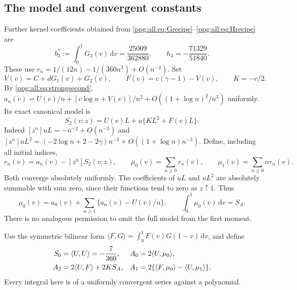 \documentclass[11pt,letterpaper]{article}
\theoremstyle{remark}\newtheorem{remark}[theorem]{Remark}
\numberwithin{equation}{section}
\newcommand{\dd}{\mathrm d}
\newcommand{\ip}[2]{\langle #1,#2\rangle}
\begin{document}
\subsection{The model and convergent constants}
Further kernel coefficients obtained from \eqref{ppg:all:eq:Grecipe}--\eqref{ppg:all:eq:Hrecipe} are
\begin{equation}\label{ppg:all:eq:thirdkernel}
 b_3^*:=\int_0^1G_3(v)\,\dd v=\frac{25009}{362880},
 \qquad h_3=-\frac{71329}{51840}.
\end{equation}
These use $r_n=1/(12n)-1/(360n^3)+O(n^{-4})$. Set
\begin{equation}\label{ppg:all:eq:VF}
 V(v)=C+dG_1(v)+G_2(v),\qquad
 F(v)=c(\gamma-1)-V(v),\qquad K=-c/2.
\end{equation}
By \eqref{ppg:all:eq:strongsecond},
$a_n(v)=U(v)/n+[c\log n+V(v)]/n^2+O((1+\log n)^2/n^3)$ uniformly. Its exact canonical model is
\begin{equation}\label{ppg:all:eq:S2}
 S_2(v;z)=U(v)L+u\{KL^2+F(v)L\}.
\end{equation}
Indeed $[z^n]uL=-n^{-2}+O(n^{-3})$ and
$[z^n]uL^2=(-2\log n+2-2\gamma)n^{-2}+O((1+\log n)n^{-3})$.
Define, including all initial indices,
\begin{equation}\label{ppg:all:eq:muThird}
 r_n(v)=a_n(v)-[z^n]S_2(v;z),\qquad
 \mu_0(v)=\sum_{n\ge0}r_n(v),\qquad
 \mu_1(v)=\sum_{n\ge0}nr_n(v).
\end{equation}
Both converge absolutely uniformly. The coefficients of $uL$ and $uL^2$ are absolutely summable with sum zero, since their functions tend to zero as $z\uparrow1$. Thus
\begin{equation}\label{ppg:all:eq:muZeroSimple}
 \mu_0(v)=a_0(v)+\sum_{n\ge1}\{a_n(v)-U(v)/n\},\qquad
 \int_0^1\mu_0(v)\,\dd v=S_A.
\end{equation}
There is no analogous permission to omit the full model from the first moment.

Use the symmetric bilinear form
$\ip FG=\int_0^1F(v)G(1-v)\,\dd v$, and define
\begin{align}
 S_0&=\ip UU=-\frac7{360},& A_0&=2\ip U{\mu_0},\notag\\
 A_2&=2\ip UF+2KS_A,& A_1&=2\{\ip F{\mu_0}-\ip U{\mu_1}\}.
 \label{ppg:all:eq:Aconstants}
\end{align}
Every integral here is of a uniformly convergent series against a polynomial.
\end{document}
